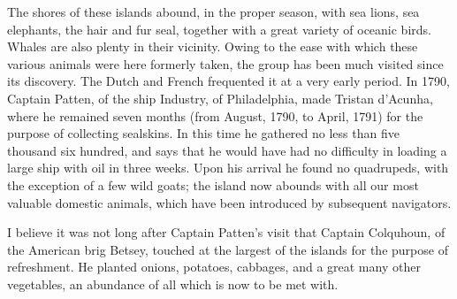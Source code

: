 The shores of these islands abound, in the proper season, with sea lions, sea
elephants, the hair and fur seal, together with a great variety of oceanic
birds. Whales are also plenty in their vicinity. Owing to the ease with which
these various animals were here formerly taken, the group has been much visited
since its discovery. The Dutch and French frequented it at a very early period.
In 1790, Captain Patten, of the ship Industry, of Philadelphia, made Tristan
d'Acunha, where he remained seven months (from August, 1790, to April, 1791) for
the purpose of collecting sealskins. In this time he gathered no less than five
thousand six hundred, and says that he would have had no difficulty in loading a
large ship with oil in three weeks. Upon his arrival he found no quadrupeds,
with the exception of a few wild goats; the island now abounds with all our most
valuable domestic animals, which have been introduced by subsequent
navigators. 

I believe it was not long after Captain Patten's visit that Captain
Colquhoun, of the American brig Betsey, touched at the largest of the islands
for the purpose of refreshment. He planted onions, potatoes, cabbages, and a
great many other vegetables, an abundance of all which is now to be met
with. 

